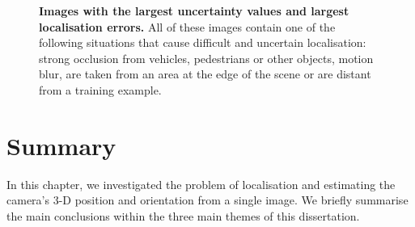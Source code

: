 \begin{figure}[t]
\begin{center}
\end{center}
   \caption[Examples of difficult images for localisation]{\textbf{Images with the largest uncertainty values and largest localisation errors.} All of these images contain one of the following situations that cause difficult and uncertain localisation: strong occlusion from vehicles, pedestrians or other objects, motion blur, are taken from an area at the edge of the scene or are distant from a training example.}
\label{fig:difficult_examples}
\end{figure}






\section{Summary}

In this chapter, we investigated the problem of localisation and estimating the camera's 3-D position and orientation from a single image. We briefly summarise the main conclusions within the three main themes of this dissertation.

